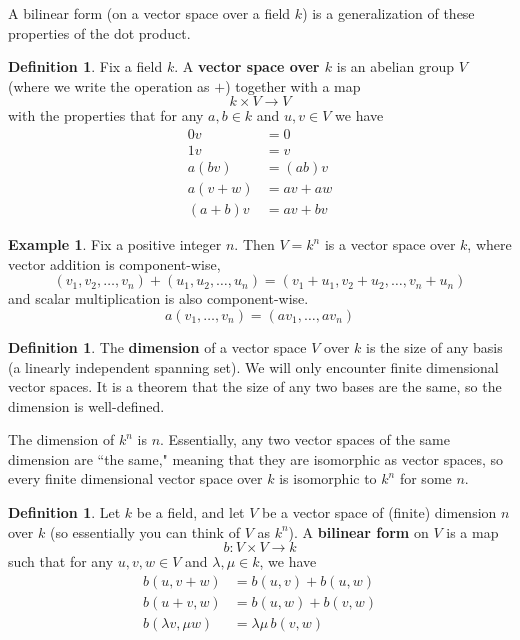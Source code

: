 \documentclass[12pt]{article}
\theoremstyle{definition}
\newtheorem{definition}[theorem]{Definition}
\newtheorem{example}[theorem]{Example}
\numberwithin{theorem}{subsection}
\newcommand{\lam}{\lambda}
\newcommand{\tbf}{\textbf}
\newcommand{\noi}{\noindent}
\begin{document}
\noi A bilinear form (on a vector space over a field $k$) is a generalization of these properties of the dot product.

\begin{definition}
Fix a field $k$. A \tbf{vector space over $k$} is an abelian group $V$ (where we write the operation as $+$) together with a map
\[
	k \times V \to V
\]
with the properties that for any $a,b \in k$ and $u,v \in V$ we have
\begin{align*}
	0v &= 0 \\
	1v &= v \\
	a(bv) &= (ab)v \\
	a(v+w) &= av + aw \\
	(a+b)v &= av + bv
\end{align*}
\end{definition}


\begin{example}
Fix a positive integer $n$. Then $V = k^n$ is a vector space over $k$, where vector addition is component-wise,
\[
	(v_1, v_2, \ldots, v_n) + (u_1, u_2, \ldots, u_n) = (v_1 + u_1, v_2 + u_2, \ldots, v_n + u_n)
\]
and scalar multiplication is also component-wise.
\[
	a(v_1, \ldots, v_n) = (av_1, \ldots, av_n)
\]
\end{example}

\begin{definition}
The \tbf{dimension} of a vector space $V$ over $k$ is the size of any basis (a linearly independent spanning set). We will only encounter finite dimensional vector spaces. It is a theorem that the size of any two bases are the same, so the dimension is well-defined. 

The dimension of $k^n$ is $n$. Essentially, any two vector spaces of the same dimension are ``the same," meaning that they are isomorphic as vector spaces, so every finite dimensional vector space over $k$ is isomorphic to $k^n$ for some $n$.
\end{definition}

\begin{definition}
Let $k$ be a field, and let $V$ be a vector space of (finite) dimension $n$ over $k$ (so essentially you can think of $V$ as $k^n$). A \tbf{bilinear form} on $V$ is a map
\[
	b:V \times V \to k
\]
such that for any $u, v, w \in V$ and $\lam, \mu \in k$, we have
\begin{align*}
	b(u, v+w) &= b(u,v) + b(u,w) \\
	b(u+v, w) &= b(u,w) + b(v,w) \\
	b(\lam v, \mu w) &= \lam \mu \, b(v,w)
\end{align*}
\end{definition}
\end{document}
